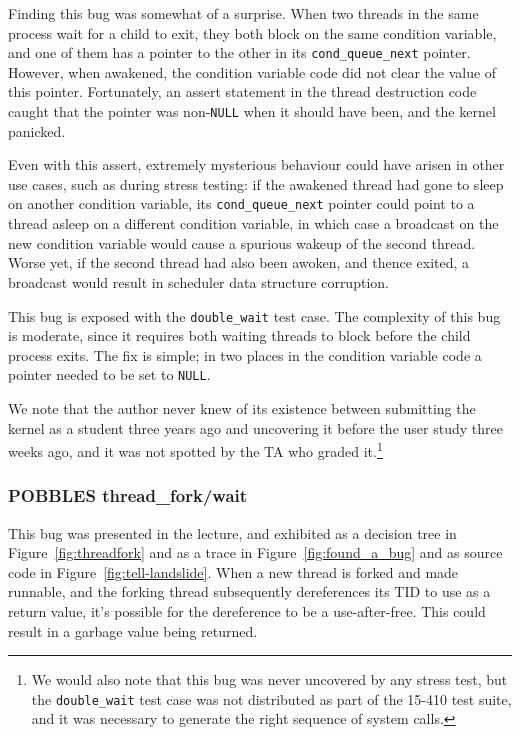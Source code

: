 Finding this bug was somewhat of a surprise. When two threads in the same process wait for a child to exit, they both block on the same condition variable, and one of them has a pointer to the other in its \texttt{cond\_queue\_next} pointer. However, when awakened, the condition variable code did not clear the value of this pointer. Fortunately, an assert statement in the thread destruction code caught that the pointer was non-\texttt{NULL} when it should have been, and the kernel panicked.

Even with this assert, extremely mysterious behaviour could have arisen in other use cases, such as during stress testing: if the awakened thread had gone to sleep on another condition variable, its \texttt{cond\_queue\_next} pointer could point to a thread asleep on a different condition variable, in which case a broadcast on the new condition variable would cause a spurious wakeup of the second thread. Worse yet, if the second thread had also been awoken, and thence exited, a broadcast would result in scheduler data structure corruption.

This bug is exposed with the \texttt{double\_wait} test case.
The complexity of this bug is moderate, since it requires both waiting threads to block before the child process exits.
The fix is simple; in two places in the condition variable code a pointer needed to be set to \texttt{NULL}.

We note that the author never knew of its existence between submitting the kernel as a student three years ago and uncovering it before the user study three weeks ago, and it was not spotted by the TA who graded it.\footnote{
We would also note that this bug was never uncovered by any stress test, but the \texttt{double\_wait} test case was not distributed as part of the 15-410 test suite, and it was necessary to generate the right sequence of system calls.}

\subsubsection{POBBLES thread\_fork/wait}
\label{sec:eval-thread-fork}

This bug was presented in the lecture, and exhibited as a decision tree in Figure~\ref{fig:threadfork} and as a trace in Figure~\ref{fig:found_a_bug} and as source code in Figure~\ref{fig:tell-landslide}. When a new thread is forked and made runnable, and the forking thread subsequently dereferences its TID to use as a return value, it's possible for the dereference to be a use-after-free. This could result in a garbage value being returned.

